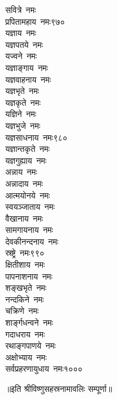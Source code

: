 \begin{multicols}{\maxColumns}
\begin{flushleft}
सवित्रे~नमः\\
प्रपितामहाय~नमः\hfill ९७०\\
यज्ञाय~नमः\\
यज्ञपतये~नमः\\
यज्वने~नमः\\
यज्ञाङ्गाय~नमः\\
यज्ञवाहनाय~नमः\\
यज्ञभृते~नमः\\
यज्ञकृते~नमः\\
यज्ञिने~नमः\\
यज्ञभुजे~नमः\\
यज्ञसाधनाय~नमः\hfill ९८०\\
यज्ञान्तकृते~नमः\\
यज्ञगुह्याय~नमः\\
अन्नाय~नमः\\
अन्नादाय~नमः\\
आत्मयोनये~नमः\\
स्वयञ्जाताय~नमः\\
वैखानाय~नमः\\
सामगायनाय~नमः\\
देवकीनन्दनाय~नमः\\
स्रष्ट्रे~नमः\hfill ९९०\\
क्षितीशाय~नमः\\
पापनाशनाय~नमः\\
शङ्खभृते~नमः\\
नन्दकिने~नमः\\
चक्रिणे~नमः\\
शार्ङ्गधन्वने~नमः\\
गदाधराय~नमः\\
रथाङ्गपाणये~नमः\\
अक्षोभ्याय~नमः\\
सर्वप्रहरणायुधाय~नमः\hfill १०००
\end{flushleft}
\end{multicols}
॥इति श्रीविष्णुसहस्रनामावलिः सम्पूर्णा॥